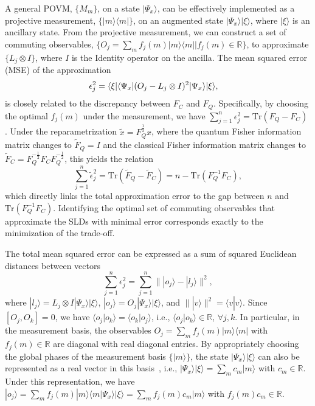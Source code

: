 \documentclass[
aps,
prl,
twocolumn,

superscriptaddress]{revtex4-2}
\newcommand{\ket}[1]{|#1\rangle}
\newcommand{\bra}[1]{\langle #1|}
\begin{document}
A general POVM, $\{M_m\}$, on a state $|\Psi_x\rangle$, can be effectively implemented as a projective measurement, $\{|m\rangle\langle m|\}$, on an augmented state $|\Psi_x\rangle|\xi\rangle$, where $|\xi\rangle$ is an ancillary state. From the projective measurement, we can construct a set of commuting observables, $\{O_j=\sum_m f_j(m)|m\rangle\langle m|| f_j(m)\in \mathbb{R}\}$, to approximate $\{L_j\otimes I\}$, where $I$ is the Identity operator on the ancilla. The mean squared error (MSE) of the approximation  ~\cite{arthurs1965,Arthurs1988,Ozawa2003,OZAWA2004367,OZAWA2004350,OZAWA200321,Ozawa_2014,Hall2004,Branciard2013,Branciard2014,2014Error,Lu2014}
 \begin{eqnarray}\label{eq:error}
 \aligned
\epsilon_j^2&=\bra{\xi}\bra{\Psi_x}(O_j-L_j\otimes I)^2\ket{\Psi_x}\ket{\xi},
 \endaligned
 \end{eqnarray}
is closely related to the discrepancy between $F_C$ and $F_Q$. Specifically, by choosing the optimal $f_j(m)$ under the measurement,
we have $\sum_{j=1}^n \epsilon_j^2=\text{Tr}(F_Q-F_C)$ \cite{pra}.
Under the reparametrization $\tilde{x}=F_Q^{\frac{1}{2}} x$, where the quantum Fisher information matrix changes to $\tilde{F}_Q=I$ and the classical Fisher information matrix changes to $\tilde{F}_C=F_Q^{-\frac{1}{2}}F_CF_Q^{-\frac{1}{2}}$, this yields the relation
\begin{equation}\label{eq:error_link}
\sum_{j=1}^n \tilde{\epsilon}_j^2=\text{Tr}(\tilde{F}_Q-\tilde{F}_C)=n-\text{Tr}(F_Q^{-1}F_C),
\end{equation}
which directly links the total approximation error to the gap between $n$ and $\text{Tr}(F_Q^{-1}F_C)$. Identifying the optimal set of commuting observables that approximate the SLDs with minimal error corresponds exactly to the minimization of the trade-off.

The total mean squared error can be expressed as a sum of squared Euclidean distances between vectors
\begin{equation}\label{eq:distance}
\sum_{j=1}^n\epsilon_j^2=\sum_{j=1}^n\||o_j\rangle-|l_j\rangle\|^2,    \end{equation}
where $|l_j\rangle=L_j\otimes I|\Psi_x\rangle|\xi\rangle$,
$|o_j\rangle=O_j|\Psi_x\rangle|\xi\rangle$, and $\||v\rangle\|^2=\langle v|v\rangle$.
Since $[O_j,O_k]=0$, we have $\langle o_j|o_k\rangle=\langle o_k|o_j\rangle$, i.e., $\langle o_j|o_k\rangle\in \mathbb{R}$, $\forall j, k$.
In particular, in the measurement basis, the observables $O_j=\sum_m f_j(m)|m\rangle\langle m|$ with $f_j(m)\in \mathbb{R}$ are diagonal with real diagonal entries. By appropriately choosing the global phases of the measurement basis $\{|m\rangle\}$, the state \( |\Psi_x\rangle|\xi\rangle \) can also be represented as a real vector in this basis~\cite{note1}, i.e., $|\Psi_x\rangle|\xi\rangle = \sum_m c_m|m\rangle$ with $c_m \in \mathbb{R}$.
Under this representation, we have $|o_j\rangle=\sum_m f_j(m)|m\rangle\langle m|\Psi_x\rangle|\xi\rangle=\sum_m f_j(m)c_m|m\rangle$ with $f_j(m)c_m\in \mathbb{R}$.
\end{document}
